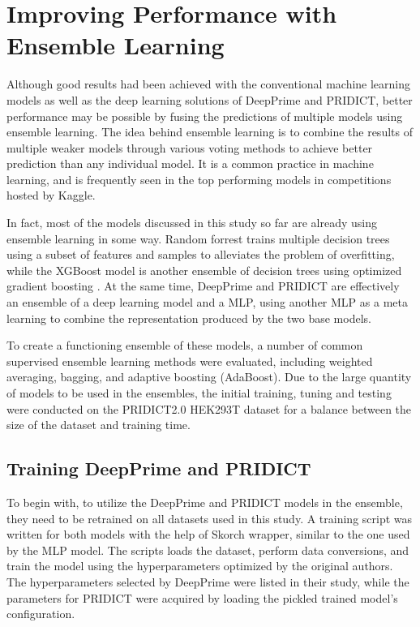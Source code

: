 \section{Improving Performance with Ensemble Learning}
\label{sec:ensemble}

Although good results had been achieved with the conventional machine learning models as well as the deep learning solutions of DeepPrime and PRIDICT, better performance may be possible by fusing the predictions of multiple models using ensemble learning.
The idea behind ensemble learning is to combine the results of multiple weaker models through various voting methods to achieve better prediction than any individual model. It is a common practice in machine learning, and is frequently seen in the top performing models in competitions hosted by Kaggle\cite{dongSurveyEnsembleLearning2020}. 

In fact, most of the models discussed in this study so far are already using ensemble learning in some way. Random forrest trains multiple decision trees using a subset of features and samples to alleviates the problem of overfitting, while the XGBoost model is another ensemble of decision trees using optimized gradient boosting \cite{chenXGBoostScalableTree2016}. At the same time, DeepPrime and PRIDICT are effectively an ensemble of a deep learning model and a MLP, using another MLP as a meta learning to combine the representation produced by the two base models. 

To create a functioning ensemble of these models, a number of common supervised ensemble learning methods were evaluated, including weighted averaging, bagging, and adaptive boosting (AdaBoost). Due to the large quantity of models to be used in the ensembles, the initial training, tuning and testing were conducted on the PRIDICT2.0 HEK293T dataset for a balance between the size of the dataset and training time. 


\subsection{Training DeepPrime and PRIDICT}
\label{sec:training-deepprime-pridict}

To begin with, to utilize the DeepPrime and PRIDICT models in the ensemble, they need to be retrained on all datasets used in this study. A training script was written for both models with the help of Skorch wrapper, similar to the one used by the MLP model. The scripts loads the dataset, perform data conversions, and train the model using the hyperparameters optimized by the original authors. The hyperparameters selected by DeepPrime were listed in their study, while the parameters for PRIDICT were acquired by loading the pickled trained model's configuration. 

